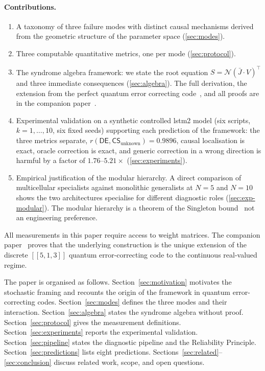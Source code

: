 \documentclass[11pt,a4paper]{article}
\newcommand{\Ccode}[3]{[\![#1,#2,#3]\!]}
\newcommand{\CS}{\mathsf{CS}}
\newcommand{\DE}{\mathsf{DE}}
\newcommand{\Jbar}{\bar{J}}
\newcommand{\Norm}{\mathcal{N}}
\begin{document}
\paragraph{Contributions.}
\begin{enumerate}[nosep]
    \item A taxonomy of three failure modes with distinct causal mechanisms derived from the geometric structure of the parameter space (\ref{sec:modes}).
    \item Three computable quantitative metrics, one per mode (\ref{sec:protocol}).
    \item The syndrome algebra framework: we state the root equation $S = \Norm(\Jbar \cdot V)^\top$ and three immediate consequences (\ref{sec:algebra}). The full derivation, the extension from the perfect quantum error correcting code~\cite{Laflamme1996, Bennett1996}, and all proofs are in the companion paper~\cite{SyndromeAlgebra}.
    \item Experimental validation on a synthetic controlled lstm2 model (six scripts, $k = 1, \ldots, 10$, six fixed seeds) supporting each prediction of the framework: the three metrics separate, $r(\DE, \CS_{\mathrm{unknown}}) = 0.9896$, causal localisation is exact, oracle correction is exact, and generic correction in a wrong direction is harmful by a factor of $1.76$--$5.21\times$ (\ref{sec:experiments}).
    \item Empirical justification of the modular hierarchy. A direct comparison of multicellular specialists against monolithic generalists at $N = 5$ and $N = 10$ shows the two architectures specialise for different diagnostic roles (\ref{sec:exp-modular}). The modular hierarchy is a theorem of the Singleton bound~\cite{Singleton1964, Ekert1996, SyndromeAlgebra} not an engineering preference.
\end{enumerate}

All measurements in this paper require access to weight matrices. The companion paper~\cite{SyndromeAlgebra} proves that the underlying construction is the unique extension of the discrete $\Ccode{5}{1}{3}$ quantum error-correcting code to the continuous real-valued regime.

The paper is organised as follows. Section~\ref{sec:motivation} motivates the stochastic framing and recounts the origin of the framework in quantum error-correcting codes. Section~\ref{sec:modes} defines the three modes and their interaction. Section~\ref{sec:algebra} states the syndrome algebra without proof. Section~\ref{sec:protocol} gives the measurement definitions. Section~\ref{sec:experiments} reports the experimental validation. Section~\ref{sec:pipeline} states the diagnostic pipeline and the Reliability Principle. Section~\ref{sec:predictions} lists eight predictions. Sections~\ref{sec:related}--\ref{sec:conclusion} discuss related work, scope, and open questions.
\end{document}

